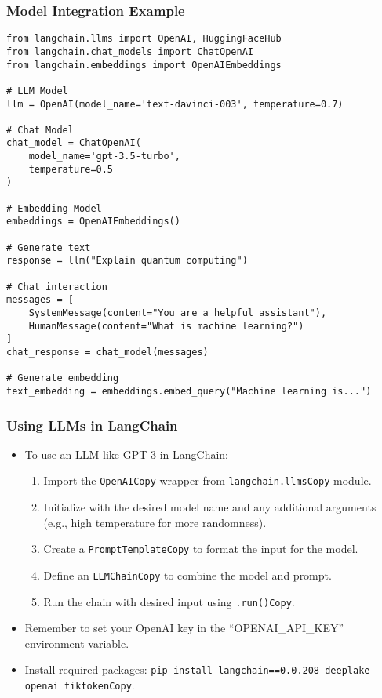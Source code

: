 \begin{frame}[fragile]\frametitle{Model Integration Example}

\begin{lstlisting}
from langchain.llms import OpenAI, HuggingFaceHub
from langchain.chat_models import ChatOpenAI
from langchain.embeddings import OpenAIEmbeddings

# LLM Model
llm = OpenAI(model_name='text-davinci-003', temperature=0.7)

# Chat Model
chat_model = ChatOpenAI(
    model_name='gpt-3.5-turbo', 
    temperature=0.5
)

# Embedding Model
embeddings = OpenAIEmbeddings()

# Generate text
response = llm("Explain quantum computing")

# Chat interaction
messages = [
    SystemMessage(content="You are a helpful assistant"),
    HumanMessage(content="What is machine learning?")
]
chat_response = chat_model(messages)

# Generate embedding
text_embedding = embeddings.embed_query("Machine learning is...")
\end{lstlisting}

\end{frame}


\begin{frame}[fragile]
\frametitle{Using LLMs in LangChain}

\begin{itemize}
    \item To use an LLM like GPT-3 in LangChain:
    \begin{enumerate}
        \item Import the \texttt{OpenAICopy} wrapper from \texttt{langchain.llmsCopy} module.
        \item Initialize with the desired model name and any additional arguments (e.g., high temperature for more randomness).
        \item Create a \texttt{PromptTemplateCopy} to format the input for the model.
        \item Define an \texttt{LLMChainCopy} to combine the model and prompt.
        \item Run the chain with desired input using \texttt{.run()Copy}.
    \end{enumerate}
    \item Remember to set your OpenAI key in the “OPENAI\_API\_KEY” environment variable.
    \item Install required packages: \texttt{pip install langchain==0.0.208 deeplake openai tiktokenCopy}.
\end{itemize}

\end{frame}

